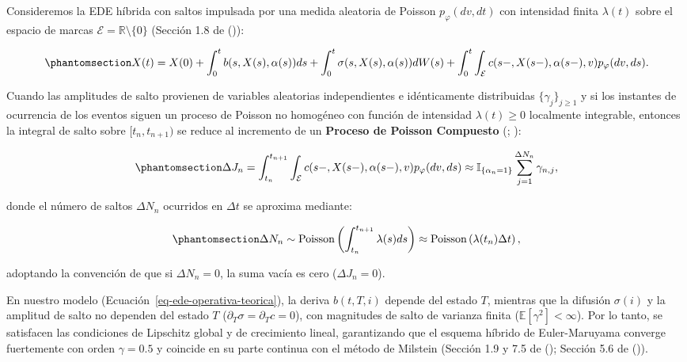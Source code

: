 \documentclass[
  spanish,
  letterpaper,
  DIV=11,
  numbers=noendperiod]{scrreprt}
\theoremstyle{plain}
\theoremstyle{plain}
\theoremstyle{plain}
\theoremstyle{definition}
\theoremstyle{remark}
\begin{document}
Consideremos la EDE híbrida con saltos impulsada por una medida
aleatoria de Poisson \(p_\varphi(dv, dt)\) con intensidad finita
\(\lambda(t)\) sobre el espacio de marcas
\(\mathcal{E} = \mathbb{R}\setminus\{0\}\) (Sección 1.8 de
()):

\begin{equation}\phantomsection\label{eq-ede-hibrida-saltos-num}{
X(t) = X(0) + \int_0^t b(s, X(s), \alpha(s))ds + \int_0^t \sigma(s, X(s), \alpha(s))dW(s) + \int_0^t \int_{\mathcal{E}} c(s-, X(s-), \alpha(s-), v) p_\varphi(dv, ds).
}\end{equation}

Cuando las amplitudes de salto provienen de variables aleatorias
independientes e idénticamente distribuidas \(\{\gamma_j\}_{j \ge 1}\) y
si los instantes de ocurrencia de los eventos siguen un proceso de
Poisson no homogéneo con función de intensidad \(\lambda(t) \geq 0\)
localmente integrable, entonces la integral de salto sobre
\([t_n, t_{n+1})\) se reduce al incremento de un \textbf{Proceso de
Poisson Compuesto} (; ):

\begin{equation}\phantomsection\label{eq-incremento-poisson-compuesto}{
\Delta J_n = \int_{t_n}^{t_{n+1}} \int_{\mathcal{E}} c(s-, X(s-), \alpha(s-), v) p_\varphi(dv, ds) \approx \mathbb{I}_{\{\alpha_n = 1\}} \sum_{j=1}^{\Delta N_n} \gamma_{n, j},
}\end{equation}

donde el número de saltos \(\Delta N_n\) ocurridos en \(\Delta t\) se
aproxima mediante:

\begin{equation}\phantomsection\label{eq-conteo-poisson-paso}{
\Delta N_n \sim \text{Poisson}\left( \int_{t_n}^{t_{n+1}} \lambda(s)ds \right) \approx \text{Poisson}\left( \lambda(t_n)\Delta t \right),
}\end{equation}

adoptando la convención de que si \(\Delta N_n = 0\), la suma vacía es
cero (\(\Delta J_n = 0\)).

En nuestro modelo (Ecuación~\ref{eq-ede-operativa-teorica}), la deriva
\(b(t, T, i)\) depende del estado \(T\), mientras que la difusión
\(\sigma(i)\) y la amplitud de salto no dependen del estado \(T\)
(\(\partial_T \sigma = \partial_T c = 0\)), con magnitudes de salto de
varianza finita (\(\mathbb{E}[\gamma^2] < \infty\)). Por lo tanto, se
satisfacen las condiciones de Lipschitz global y de crecimiento lineal,
garantizando que el esquema híbrido de Euler-Maruyama converge
fuertemente con orden \(\gamma = 0.5\) y coincide en su parte continua
con el método de Milstein (Sección 1.9 y 7.5 de
();
Sección 5.6 de ()).
\end{document}
